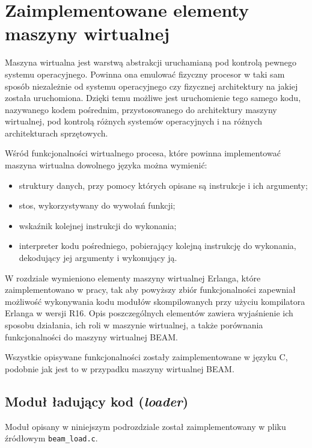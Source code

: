 \chapter{Zaimplementowane elementy maszyny wirtualnej}
\label{cha:maszyna}

Maszyna wirtualna jest warstwą abstrakcji uruchamianą pod kontrolą pewnego systemu operacyjnego.
Powinna ona emulować fizyczny procesor w taki sam sposób niezależnie od systemu operacyjnego czy fizycznej architektury na jakiej została uruchomiona.
Dzięki temu możliwe jest uruchomienie tego samego kodu, nazywanego kodem pośrednim, przystosowanego do architektury maszyny wirtualnej, pod kontrolą różnych systemów operacyjnych i na różnych architekturach sprzętowych.

Wśród funkcjonalności wirtualnego procesa, które powinna implementować maszyna wirtualna dowolnego języka można wymienić:
\begin{itemize}
\item struktury danych, przy pomocy których opisane są instrukcje i ich argumenty;
\item stos, wykorzystywany do wywołań funkcji;
\item wskaźnik kolejnej instrukcji do wykonania;
\item interpreter kodu pośredniego, pobierający kolejną instrukcję do wykonania, dekodujący jej argumenty i wykonujący ją.
\end{itemize}

W rozdziale wymieniono elementy maszyny wirtualnej Erlanga, które zaimplementowano w pracy, tak aby powyższy zbiór funkcjonalności zapewniał możliwość wykonywania kodu modułów skompilowanych przy użyciu kompilatora Erlanga w wersji R16.
Opis poszczególnych elementów zawiera wyjaśnienie ich sposobu działania, ich roli w maszynie wirtualnej, a także porównania
funkcjonalności do maszyny wirtualnej BEAM.

Wszystkie opisywane funkcjonalności zostały zaimplementowane w języku C, podobnie jak jest to w przypadku maszyny wirtualnej BEAM.

\section{Moduł ładujący kod (\emph{loader})}
\label{sec:maszynaLoader}

Moduł opisany w niniejszym podrozdziale został zaimplementowany w pliku źródłowym \texttt{beam\_load.c}.

